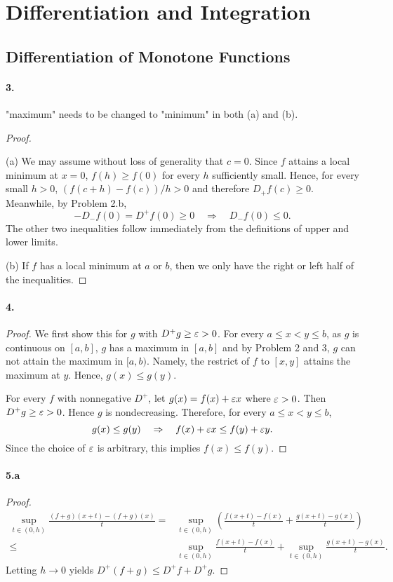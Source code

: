 \section{Differentiation and Integration}
\subsection{Differentiation of Monotone Functions}
  \paragraph{3.}
    "maximum" needs to be changed to "minimum" in both (a) and (b).
  \begin{proof}
    $\,$\par
    (a) We may assume without loss of generality that $c=0$. Since $f$ attains a
    local minimum at $x=0$, $f(h)\ge f(0)$ for every $h$ sufficiently small.
    Hence, for every small $h>0$, $(f(c+h)-f(c))/h>0$ and therefore $D_+f(c)\ge
    0$. Meanwhile, by Problem 2.b, 
    \[
      -D_{-}f(0) = D^+f(0) \ge 0 \quad\Rightarrow\quad 
      D_{-}f(0) \le 0.
    \]
    The other two inequalities follow immediately from the definitions of upper 
    and lower limits.\par
    (b) If $f$ has a local minimum at $a$ or $b$, then we only have the right or
    left half of the inequalities.
  \end{proof}

  \paragraph{4.}
  \begin{proof}
    We first show this for $g$ with $D^+g\ge\varepsilon>0$. For every $a\le x<y\le b$,
    as $g$ is continuous on $[a,b]$, $g$ has a maximum in $[a,b]$ and by Problem
    2 and 3, $g$ can not attain the maximum in $[a,b)$. Namely, the restrict of
    $f$ to $[x,y]$ attains the maximum at $y$. Hence, $g(x)\le g(y)$.\par
    For every $f$ with nonnegative $D^+$, let $g(x)=f(x)+\varepsilon x$ where $\varepsilon>0$.
    Then $D^+g\ge\varepsilon >0$. Hence $g$ is nondecreasing. Therefore, for every $a
    \le x<y\le b$, 
    \[
      g(x)\le g(y) \quad\Rightarrow\quad f(x)+\varepsilon x \le f(y)+\varepsilon y.
    \]
    Since the choice of $\varepsilon$ is arbitrary, this implies $f(x)\le f(y)$.
  \end{proof}

  \paragraph{5.a}
  \begin{proof}
    \begin{align*}
       \sup_{t\in(0,h)}\frac{(f+g)(x+t)-(f+g)(x)}{t} 
      =&\sup_{t\in(0,h)}\left(\frac{f(x+t)-f(x)}{t}+
        \frac{g(x+t)-g(x)}{t}\right) \\
      \le&\sup_{t\in(0,h)}\frac{f(x+t)-f(x)}{t}+
          \sup_{t\in(0,h)}\frac{g(x+t)-g(x)}{t}.
    \end{align*}
    Letting $h\to 0$ yields $D^+(f+g)\le D^+f+D^+g$.
  \end{proof}

